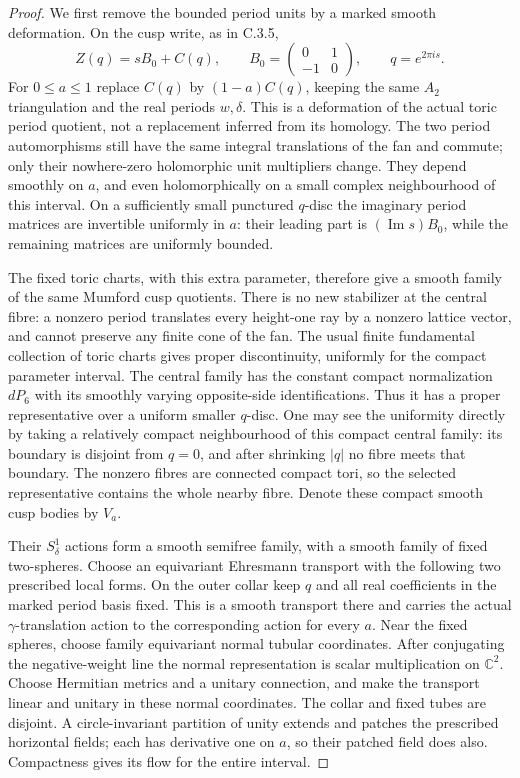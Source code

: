 \begin{proof}
We first remove the bounded period units by a marked smooth
deformation. On the cusp write, as in C.3.5,
\[
 Z(q)=sB_0+C(q),\qquad
 B_0=\begin{pmatrix}0&1\\-1&0\end{pmatrix},\qquad
 q=e^{2\pi i s}.
\]
For $0\leq a\leq1$ replace $C(q)$ by $(1-a)C(q)$, keeping
the same $A_2$ triangulation and the real periods $w,\delta$.
This is a deformation of the actual toric period quotient,
not a replacement inferred from its homology. The two period
automorphisms still have the same integral translations of the
fan and commute; only their nowhere-zero holomorphic unit
multipliers change. They depend smoothly on $a$, and even
holomorphically on a small complex neighbourhood of this
interval. On a sufficiently small punctured $q$-disc the
imaginary period matrices are invertible uniformly in $a$:
their leading part is $(\operatorname{Im}s)B_0$, while the
remaining matrices are uniformly bounded.

The fixed toric charts, with this extra parameter, therefore
give a smooth family of the same Mumford cusp quotients.
There is no new stabilizer at the central fibre: a nonzero
period translates every height-one ray by a nonzero lattice
vector, and cannot preserve any finite cone of the fan.
The usual finite fundamental collection of toric charts gives
proper discontinuity, uniformly for the compact parameter
interval. The central family has the constant compact
normalization $dP_6$ with its smoothly varying opposite-side
identifications. Thus it has a proper representative over a
uniform smaller $q$-disc. One may see the uniformity directly
by taking a relatively compact neighbourhood of this compact
central family: its boundary is disjoint from $q=0$, and after
shrinking $|q|$ no fibre meets that boundary. The nonzero
fibres are connected compact tori, so the selected representative
contains the whole nearby fibre. Denote these compact smooth
cusp bodies by $V_a$.

Their $S^1_\delta$ actions form a smooth semifree family, with
a smooth family of fixed two-spheres. Choose an equivariant
Ehresmann transport with the following two prescribed local
forms. On the outer collar keep $q$ and all real coefficients
in the marked period basis fixed. This is a smooth transport
there and carries the actual $\gamma$-translation action to
the corresponding action for every $a$. Near the fixed spheres,
choose family equivariant normal tubular coordinates. After
conjugating the negative-weight line the normal representation
is scalar multiplication on $\mathbb C^2$. Choose Hermitian
metrics and a unitary connection, and make the transport
linear and unitary in these normal coordinates. The collar
and fixed tubes are disjoint. A circle-invariant partition of
unity extends and patches the prescribed horizontal fields;
each has derivative one on $a$, so their patched field does
also. Compactness gives its flow for the entire interval.


\end{proof}
